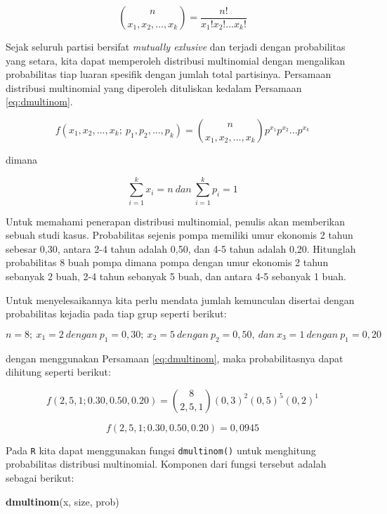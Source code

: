 \documentclass[]{book}
\newenvironment{Shaded}{\begin{snugshade}}{\end{snugshade}}
\newcommand{\KeywordTok}[1]{\textcolor[rgb]{0.13,0.29,0.53}{\textbf{#1}}}
\newcommand{\NormalTok}[1]{#1}
\begin{document}
\[
\binom{n}{x_1,x_2,...,x_k}=\frac{n!}{x_1!x_2!...x_k!}
\]

Sejak seluruh partisi bersifat \emph{mutually exlusive} dan terjadi
dengan probabilitas yang setara, kita dapat memperoleh distribusi
multinomial dengan mengalikan probabilitas tiap luaran spesifik dengan
jumlah total partisinya. Persamaan distribusi multinomial yang diperoleh
dituliskan kedalam Persamaan \eqref{eq:dmultinom}.

\begin{equation}
   f\left(x_1,x_2,...,x_k;\ p_1,p_2,...,p_k\right)=\binom{n}{x_1,x_2,...,x_k}p^{x_1}p^{x_2}...p^{x_k}
  \label{eq:dmultinom}
\end{equation}

dimana

\begin{equation}
   \sum_{i=1}^kx_i=n\ dan\ \sum_{i=1}^kp_i=1
  \label{eq:dmultinom2}
\end{equation}

Untuk memahami penerapan distribusi multinomial, penulis akan memberikan
sebuah studi kasus. Probabilitas sejenis pompa memiliki umur ekonomis 2
tahun sebesar 0,30, antara 2-4 tahun adalah 0,50, dan 4-5 tahun adalah
0,20. Hitunglah probabilitas 8 buah pompa dimana pompa dengan umur
ekonomis 2 tahun sebanyak 2 buah, 2-4 tahun sebanyak 5 buah, dan antara
4-5 sebanyak 1 buah.

Untuk menyelesaikannya kita perlu mendata jumlah kemunculan disertai
dengan probabilitas kejadia pada tiap grup seperti berikut:

\[
n=8;\ x_1=2\ dengan\ p_1=0,30;\ x_2=5\ dengan\ p_2=0,50,\ dan\ x_3=1\ dengan\ p_1=0,20\ 
\]

dengan menggunakan Persamaan \eqref{eq:dmultinom}, maka probabilitasnya
dapat dihitung seperti berikut:

\[
f\left(2,5,1;0.30,0.50,0.20\right)=\binom{8}{2,5,1}\left(0,3\right)^2\left(0,5\right)^5\left(0,2\right)^1
\]

\[
f\left(2,5,1;0.30,0.50,0.20\right)=0,0945
\]

Pada \texttt{R} kita dapat menggunakan fungsi \texttt{dmultinom()} untuk
menghitung probabilitas distribusi multinomial. Komponen dari fungsi
tersebut adalah sebagai berikut:

\begin{Shaded}
\begin{Highlighting}[]
\KeywordTok{dmultinom}\NormalTok{(x, size, prob)}
\end{Highlighting}
\end{Shaded}
\end{document}
